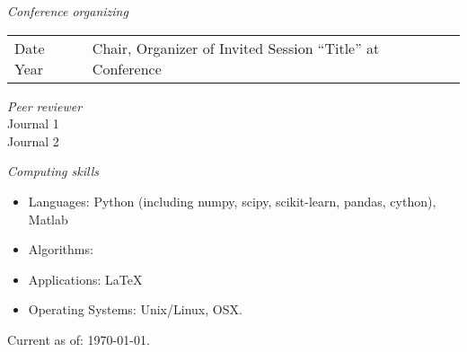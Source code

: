 \documentclass[line,10pt]{res}
\begin{document}
\begin{resume}

{\it Conference organizing}\\[0.5em]
\begin{tabular}{p{0.9in} p{5.1in}}
Date Year & Chair, Organizer of Invited Session ``Title'' at Conference\\[0.5em]
\end{tabular}

{\it Peer reviewer}\\[0.5em]
Journal 1\\
Journal 2

{\it Computing skills}\\
\begin{itemize}
\item Languages: Python (including numpy, scipy, scikit-learn, pandas, cython), Matlab
\item Algorithms: 
\item Applications: \LaTeX
\item Operating Systems: Unix/Linux, OSX.\\
\end{itemize}


\end{resume}
\null\hfill Current as of: \today.
\end{document}
